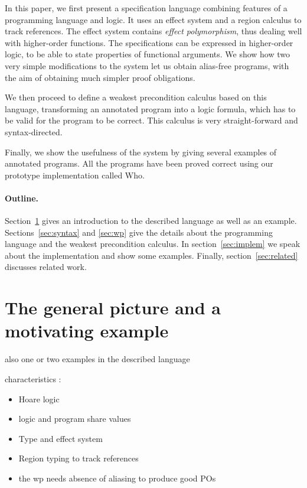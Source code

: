 \documentclass[a4paper]{llncs}
\newcommand{\who}{Who}
\begin{document}
In this paper, we first present a specification language combining features of
a programming language and logic. It uses an effect system and a region
calculus to track references. The effect system contains {\em effect
polymorphism}, thus dealing well with higher-order functions. The
specifications can be expressed in higher-order logic, to be able to state
properties of functional arguments. We show how two very simple modifications
to the system let us obtain alias-free programs, with the aim of obtaining
much simpler proof obligations.

We then proceed to define a weakest precondition calculus based on this
language, transforming an annotated program into a logic formula, which has to
be valid for the program to be correct. This calculus is very straight-forward
and syntax-directed.

Finally, we show the usefulness of the system by giving several examples of
annotated programs. All the programs have been proved correct using our
prototype implementation called \who.

\paragraph{Outline.}
Section~\ref{sec:genpic} gives an introduction to the described language as
well as an example. Sections~\ref{sec:syntax} and \ref{sec:wp} give the
details about the programming language and the weakest precondition calculus.
In section~\ref{sec:implem} we speak about the implementation and show some
examples. Finally, section~\ref{sec:related} discusses related work.

\section{The general picture and a motivating example}
\label{sec:genpic}
also one or two examples in the described language

characteristics : 
\begin{itemize}
  \item Hoare logic
  \item logic and program share values  
  \item Type and effect system
  \item Region typing to track references
  \item the wp needs absence of aliasing to produce good POs
\end{itemize}
\end{document}
